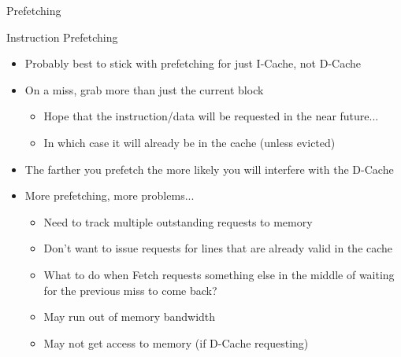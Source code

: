\documentclass[table,dvipsnames]{beamer}
\begin{document}
\begin{frame}[fragile]{Prefetching}
	\begin{block}{Instruction Prefetching}
	\begin{itemize}
		\item Probably best to stick with prefetching for just I-Cache, not D-Cache
		\item On a miss, grab more than just the current block
		\begin{itemize} \item Hope that the instruction/data will be requested in the near future...
			\item In which case it will already be in the cache (unless evicted) \end{itemize}
		\item The farther you prefetch the more likely you will interfere with the D-Cache
		\item More prefetching, more problems...
		\begin{itemize} 
			\item Need to track multiple outstanding requests to memory
			\item Don't want to issue requests for lines that are already valid in the cache
			\item What to do when Fetch requests something else in the middle of waiting for the previous miss to come back?
			\item May run out of memory bandwidth 
			\item May not get access to memory (if D-Cache requesting)
		\end{itemize}
	\end{itemize}

	\end{block}	
\end{frame}
\end{document}
